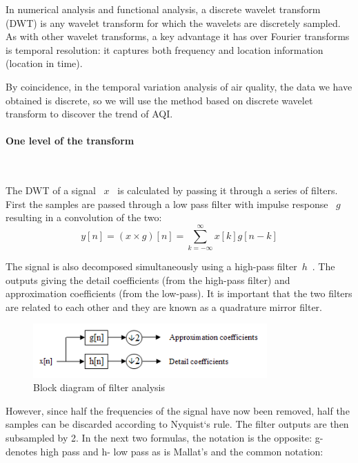 \documentclass[a4paper,11pt]{article}
\begin{document}
\par In numerical analysis and functional analysis, a discrete wavelet transform (DWT) is any wavelet transform for which the wavelets are discretely sampled. As with other wavelet transforms, a key advantage it has over Fourier transforms is temporal resolution: it captures both frequency and location information (location in time).
\par By coincidence, in the temporal variation analysis of air quality, the data we have obtained is discrete, so we will use the method based on discrete wavelet transform to discover the trend of AQI.

\paragraph{One level of the transform}
\textrm{\\}
    \par The DWT of a signal ~$x$~ is calculated by passing it through a series of filters. First the samples are passed through a low pass filter with impulse response ~$g$~ resulting in a convolution of the two:
    \begin{equation}
    y[n] = (x \times g)[n] = \sum\limits_{k =  - \infty }^\infty  {x[k] g[n - k]} 
    \end{equation}
    \par The signal is also decomposed simultaneously using a high-pass filter~$h$~. The outputs giving the detail coefficients (from the high-pass filter) and approximation coefficients (from the low-pass). It is important that the two filters are related to each other and they are known as a quadrature mirror filter.
    \begin{figure}[h]%
    \centering %
    \includegraphics[width=0.8\textwidth]{./Pic/WaveletsDWT.png}
    \caption{Block diagram of filter analysis} 
    \label{fig:WaveletsDWT}  
    \end{figure}
    \par However, since half the frequencies of the signal have now been removed, half the samples can be discarded according to Nyquist‘s rule. The filter outputs are then subsampled by 2. In the next two formulas, the notation is the opposite: g- denotes high pass and h- low pass as is Mallat's and the common notation:
\end{document}
